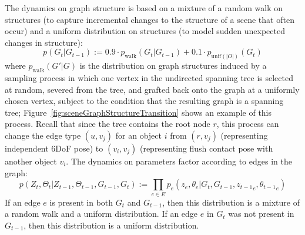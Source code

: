The dynamics on graph structure is based on a mixture of a random walk on structures (to capture incremental changes to the structure of a scene that often occur) and a uniform distribution on structures (to model sudden unexpected changes in structure):
\begin{equation}
    p(G_t | G_{t-1}) :=  0.9 \cdot p_{\mathrm{walk}}(G_t | G_{t-1}) + 0.1 \cdot p_{\mathrm{unif}(|O|)}(G_t)
\end{equation}
where $p_{\mathrm{walk}}(G' | G)$ is the distribution on graph structures induced by a sampling process in which one vertex in the undirected spanning tree is selected at random, severed from the tree, and grafted back onto the graph at a uniformly chosen vertex, subject to the condition that the resulting graph is a spanning tree;
Figure~\ref{fig:sceneGraphStructureTransition} shows an example of this process.
Recall that since the tree contains the root node $r$, this process can change the edge type $(u, v_j)$ for an object $i$ from $(r, v_j)$ (representing independent 6DoF pose) to $(v_i, v_j)$ (representing flush contact pose with another object $v_i$.
The dynamics on parameters factor according to edges in the graph:
\begin{equation}
    p(Z_t, \Theta_t | Z_{t-1}, \Theta_{t-1}, G_{t-1}, G_t) := \prod_{e \in E} p_e(z_e, \theta_e | G_t, G_{t-1}, {z_{t-1}}_e, {\theta_{t-1}}_e)
\end{equation}
If an edge $e$ is present in both $G_t$ and $G_{t-1}$, then this distribution is a mixture of a random walk and a uniform distribution.
If an edge $e$ in $G_t$ was not present in $G_{t-1}$, then this distribution is a uniform distribution.

